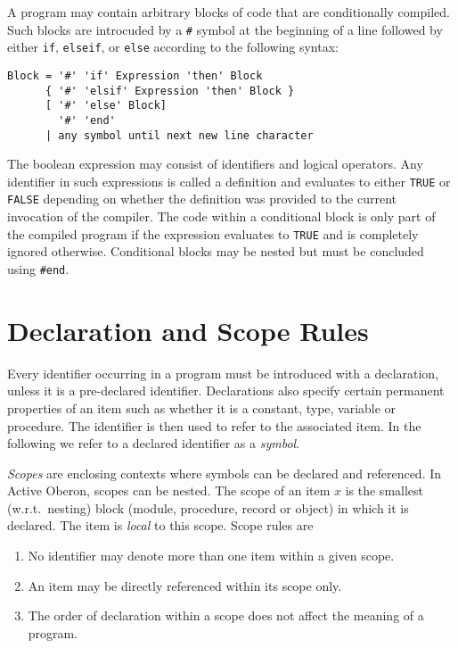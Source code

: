 \documentclass[a4wide,11pt]{article}
\begin{document}
A program may contain arbitrary blocks of code that are conditionally compiled.
Such blocks are introcuded by a \lstinline"#" symbol at the beginning of a line followed by either \lstinline"if", \lstinline"elseif", or \lstinline"else" according to the following syntax:

\begin{lstlisting}[style = ebnf]
Block = '#' 'if' Expression 'then' Block
      { '#' 'elsif' Expression 'then' Block }
      [ '#' 'else' Block]
        '#' 'end'
      | any symbol until next new line character
\end{lstlisting}

The boolean expression may consist of identifiers and logical operators.
Any identifier in such expressions is called a definition and evaluates to either \lstinline"TRUE" or  \lstinline"FALSE" depending on whether the definition was provided to the current invocation of the compiler.
The code within a conditional block is only part of the compiled program if the expression evaluates to \lstinline"TRUE" and is completely ignored otherwise.
Conditional blocks may be nested but must be concluded using \lstinline"#end".

\section{Declaration and Scope Rules}
Every identifier occurring in a program must be introduced with a declaration, unless it is a pre-declared identifier.
Declarations also specify certain permanent properties of an item such as whether it is a constant, type, variable or procedure.
The identifier is then used to refer to the associated item.
In the following we refer to a declared identifier as a \emph{symbol}.

\emph{Scopes} are enclosing contexts where symbols can be declared and referenced.
In Active Oberon, scopes can be nested.
The scope of an item $x$ is the smallest (w.r.t.\ nesting) block (module, procedure, record or object) in which it is declared.
The item is \emph{local} to this scope.
Scope rules are
\begin{enumerate}
\item No identifier may denote more than one item within a given scope.
\item An item may be directly referenced within its scope only.
\item The order of declaration within a scope does not affect the meaning of a program.
\end{enumerate}
\end{document}
